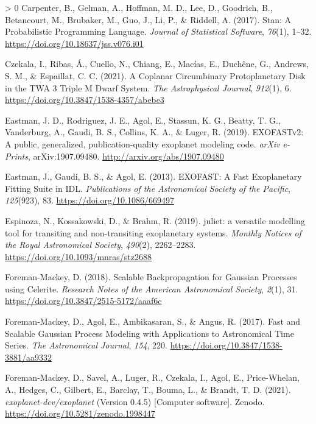 \documentclass[10pt,a4paper,onecolumn]{article}
\newlength{\cslhangindent}
\newenvironment{CSLReferences}[3] %
 {%
  \setlength{\parindent}{0pt}
  \ifodd #1 \everypar{\setlength{\hangindent}{\cslhangindent}}\ignorespaces\fi
  \ifnum #2 > 0
  \setlength{\parskip}{#2\baselineskip}
  \fi
 }%
 {}
\begin{document}
\begin{CSLReferences}{1}{0}
\leavevmode\hypertarget{ref-carpenter17}{}%
Carpenter, B., Gelman, A., Hoffman, M. D., Lee, D., Goodrich, B.,
Betancourt, M., Brubaker, M., Guo, J., Li, P., \& Riddell, A. (2017).
{Stan: A Probabilistic Programming Language}. \emph{Journal of
Statistical Software}, \emph{76}(1), 1--32.
\url{https://doi.org/10.18637/jss.v076.i01}

\leavevmode\hypertarget{ref-czekala21}{}%
Czekala, I., Ribas, Á., Cuello, N., Chiang, E., Macías, E., Duchêne, G.,
Andrews, S. M., \& Espaillat, C. C. (2021). {A Coplanar Circumbinary
Protoplanetary Disk in the TWA 3 Triple M Dwarf System}. \emph{The
Astrophysical Journal}, \emph{912}(1), 6.
\url{https://doi.org/10.3847/1538-4357/abebe3}

\leavevmode\hypertarget{ref-eastman19}{}%
Eastman, J. D., Rodriguez, J. E., Agol, E., Stassun, K. G., Beatty, T.
G., Vanderburg, A., Gaudi, B. S., Collins, K. A., \& Luger, R. (2019).
{EXOFASTv2: A public, generalized, publication-quality exoplanet
modeling code}. \emph{arXiv e-Prints}, arXiv:1907.09480.
\url{http://arxiv.org/abs/1907.09480}

\leavevmode\hypertarget{ref-eastman13}{}%
Eastman, J., Gaudi, B. S., \& Agol, E. (2013). {EXOFAST: A Fast
Exoplanetary Fitting Suite in IDL}. \emph{Publications of the
Astronomical Society of the Pacific}, \emph{125}(923), 83.
\url{https://doi.org/10.1086/669497}

\leavevmode\hypertarget{ref-espinoza19}{}%
Espinoza, N., Kossakowski, D., \& Brahm, R. (2019). {juliet: a versatile
modelling tool for transiting and non-transiting exoplanetary systems}.
\emph{Monthly Notices of the Royal Astronomical Society}, \emph{490}(2),
2262--2283. \url{https://doi.org/10.1093/mnras/stz2688}

\leavevmode\hypertarget{ref-foremanmackey18}{}%
Foreman-Mackey, D. (2018). {Scalable Backpropagation for Gaussian
Processes using Celerite}. \emph{Research Notes of the American
Astronomical Society}, \emph{2}(1), 31.
\url{https://doi.org/10.3847/2515-5172/aaaf6c}

\leavevmode\hypertarget{ref-foremanmackey17}{}%
Foreman-Mackey, D., Agol, E., Ambikasaran, S., \& Angus, R. (2017).
{Fast and Scalable Gaussian Process Modeling with Applications to
Astronomical Time Series}. \emph{The Astronomical Journal}, \emph{154},
220. \url{https://doi.org/10.3847/1538-3881/aa9332}

\leavevmode\hypertarget{ref-zenodo}{}%
Foreman-Mackey, D., Savel, A., Luger, R., Czekala, I., Agol, E.,
Price-Whelan, A., Hedges, C., Gilbert, E., Barclay, T., Bouma, L., \&
Brandt, T. D. (2021). \emph{{exoplanet-dev/exoplanet}} (Version 0.4.5)
{[}Computer software{]}. Zenodo.
\url{https://doi.org/10.5281/zenodo.1998447}


\end{CSLReferences}
\end{document}
